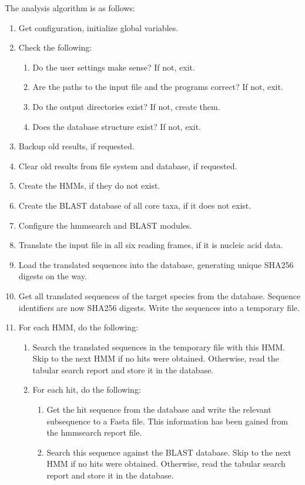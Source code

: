 The analysis algorithm is as follows:

\begin{enumerate}
	\item Get configuration, initialize global variables.
	\item Check the following:
	\begin{enumerate}
		\item Do the user settings make sense? If not, exit.
		\item Are the paths to the input file and the programs correct? If not,
			exit.
		\item Do the output directories exist? If not, create them.
		\item Does the database structure exist? If not, exit.
	\end{enumerate}
	\item Backup old results, if requested.
	\item Clear old results from file system and database, if requested.
	\item Create the HMMs, if they do not exist.
	\item Create the BLAST database of all core taxa, if it does not exist.
	\item Configure the hmmsearch and BLAST modules.
	\item Translate the input file in all six reading frames, if it is nucleic
		acid data.
	\item Load the translated sequences into the database, generating unique
		SHA256 digests on the way.
	\item Get all translated sequences of the target species from the database.
		Sequence identifiers are now SHA256 digests. Write the sequences into a
		temporary file.
	\item For each HMM, do the following:
	\begin{enumerate}
		\item Search the translated sequences in the temporary file with this HMM.
			Skip to the next HMM if no hits were obtained. Otherwise, read the tabular
			search report and store it in the database. 
		\item For each hit, do the following:
		\begin{enumerate}
			\item Get the hit sequence from the database and write the relevant
				subsequence to a Fasta file. This information has been gained from the
				hmmsearch report file.
			\item Search this sequence against the BLAST database. Skip to the next
				HMM if no hits were obtained. Otherwise, read the tabular search report
				and store it in the database. 
		\end{enumerate}
	\end{enumerate}
\end{enumerate}

